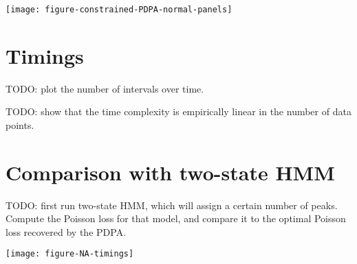 \documentclass{article}
\begin{document}
\texttt{[image: figure-constrained-PDPA-normal-panels]}

\section{Timings}

TODO: plot the number of intervals over time.

TODO: show that the time complexity is empirically linear in the
number of data points.

\section{Comparison with two-state HMM}

TODO: first run two-state HMM, which will assign a certain number of
peaks. Compute the Poisson loss for that model, and compare it to the
optimal Poisson loss recovered by the PDPA.

\texttt{[image: figure-NA-timings]}



\end{document}
